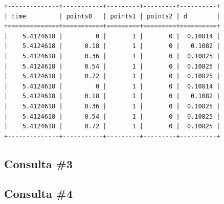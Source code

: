 \begin{minipage}[c]{0.95\textwidth}
\begin{lstlisting}[language=sqlresults,label={lst:experiments-2-sqlresults},caption={[Resultados da consulta \#2.]Resultados da consulta \#2 (10 tuplas, 5,92~ms).}]
+--------------+-----------+---------+---------+----------+
| time         | points0   | points1 | points2 | d        |
+==============+===========+=========+=========+==========+
|    5.4124618 |         0 |       1 |       0 |  0.10814 |
|    5.4124618 |      0.18 |       1 |       0 |   0.1082 |
|    5.4124618 |      0.36 |       1 |       0 |  0.10825 |
|    5.4124618 |      0.54 |       1 |       0 |  0.10825 |
|    5.4124618 |      0.72 |       1 |       0 |  0.10825 |
|    5.4124618 |         0 |       1 |       0 |  0.10814 |
|    5.4124618 |      0.18 |       1 |       0 |   0.1082 |
|    5.4124618 |      0.36 |       1 |       0 |  0.10825 |
|    5.4124618 |      0.54 |       1 |       0 |  0.10825 |
|    5.4124618 |      0.72 |       1 |       0 |  0.10825 |
+--------------+-----------+---------+---------+----------+
\end{lstlisting}
\end{minipage}


\subsection{Consulta \#3}


\subsection{Consulta \#4}

